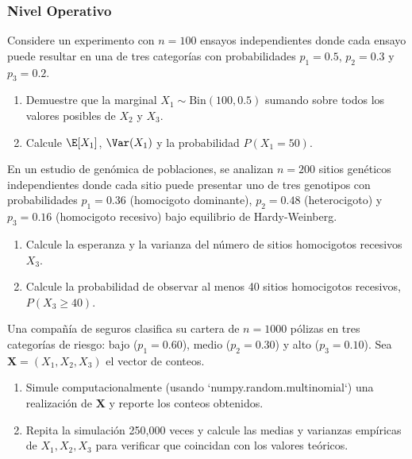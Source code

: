 \subsubsection*{Nivel Operativo}

\begin{problema}
	\label{prob:3.8.4}
	Considere un experimento con $n = 100$ ensayos independientes donde cada ensayo puede resultar en una de tres categorías con probabilidades $p_{1} = 0.5$, $p_{2} = 0.3$ y $p_{3} = 0.2$.
	\begin{enumerate}
		\item Demuestre que la marginal $X_{1} \sim \text{Bin}(100, 0.5)$ sumando sobre todos los valores posibles de $X_{2}$ y $X_{3}$.
		\item Calcule $\E[X_{1}]$, $\Var(X_{1})$ y la probabilidad $P(X_{1} = 50)$.
	\end{enumerate}
\end{problema}

\begin{problema}
	\label{prob:3.8.5}
	En un estudio de genómica de poblaciones, se analizan $n = 200$ sitios genéticos independientes donde cada sitio puede presentar uno de tres genotipos con probabilidades $p_{1} = 0.36$ (homocigoto dominante), $p_{2} = 0.48$ (heterocigoto) y $p_{3} = 0.16$ (homocigoto recesivo) bajo equilibrio de Hardy-Weinberg.
	\begin{enumerate}
		\item Calcule la esperanza y la varianza del número de sitios homocigotos recesivos $X_{3}$.
		\item Calcule la probabilidad de observar al menos 40 sitios homocigotos recesivos, $P(X_{3} \ge 40)$.
	\end{enumerate}
\end{problema}

\begin{problema}
	\label{prob:3.8.6}
	Una compañía de seguros clasifica su cartera de $n = 1000$ pólizas en tres categorías de riesgo: bajo ($p_{1} = 0.60$), medio ($p_{2} = 0.30$) y alto ($p_{3} = 0.10$). Sea $\bm{X} = (X_{1}, X_{2}, X_{3})$ el vector de conteos.
	\begin{enumerate}
		\item Simule computacionalmente (usando `numpy.random.multinomial`) una realización de $\bm{X}$ y reporte los conteos obtenidos.
		\item Repita la simulación 250{,}000 veces y calcule las medias y varianzas empíricas de $X_{1}, X_{2}, X_{3}$ para verificar que coincidan con los valores teóricos.
	\end{enumerate}
\end{problema}

